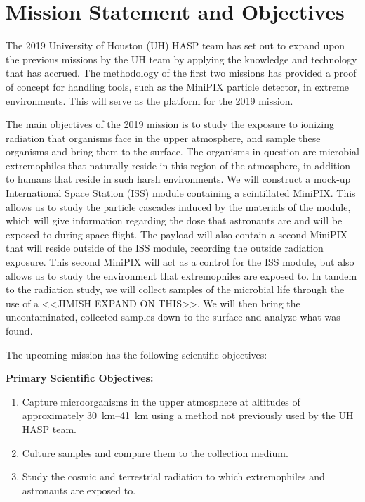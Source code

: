 \section{Mission Statement and Objectives}
\label{sec:Introduction}


The 2019 University of Houston (UH) HASP team has set out to expand upon the previous missions \cite{SORA1}\cite{SORA2} by the UH team by applying the knowledge and technology that has accrued.
The methodology of the first two missions has provided a proof of concept for handling tools, such as the MiniPIX particle detector,  in extreme environments.
This will serve as the platform for the 2019 mission.

The main objectives of the 2019 mission is to study the exposure to ionizing radiation that organisms face in the upper atmosphere, and sample these organisms and bring them to the surface.
The organisms in question are microbial extremophiles that naturally reside in this region of the atmosphere, in addition to humans that reside in such harsh environments.
We will construct a mock-up International Space Station (ISS) module containing a scintillated MiniPIX.
This allows us to study the particle cascades induced by the materials of the module, which will give information regarding the dose that astronauts are and will be exposed to during space flight.
The payload will also contain a second MiniPIX that will reside outside of the ISS module, recording the outside radiation exposure.
This second MiniPIX will act as a control for the ISS module, but also allows us to study the environment that extremophiles are exposed to.
In tandem to the radiation study, we will collect samples of the microbial life through the use of a <<JIMISH EXPAND ON THIS>>. We will then bring the uncontaminated, collected samples down to the surface and analyze what was found.

The upcoming mission has the following scientific objectives:

{\bf Primary Scientific Objectives:}
	\begin{enumerate}
	\item Capture microorganisms in the upper atmosphere at altitudes of approximately \SIrange{30}{41}{\kilo\meter} using a method not previously used by the UH HASP team. 
	\item Culture samples and compare them to the collection medium.
	\item Study the cosmic and terrestrial radiation to which extremophiles and astronauts are exposed to.
	\end{enumerate}
	

